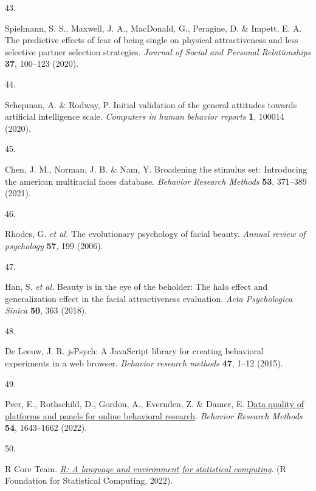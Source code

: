 \documentclass[
  man,floatsintext]{apa6}
\newlength{\cslhangindent}
\newlength{\csllabelwidth}
\newlength{\cslentryspacingunit} %
\newenvironment{CSLReferences}[2] %
 {%
  \setlength{\parindent}{0pt}
  \ifodd #1
  \let\oldpar\par
  \def\par{\hangindent=\cslhangindent\oldpar}
  \fi
  \setlength{\parskip}{#2\cslentryspacingunit}
 }%
 {}
\newcommand{\CSLLeftMargin}[1]{\parbox[t]{\csllabelwidth}{#1}}
\newcommand{\CSLRightInline}[1]{\parbox[t]{\linewidth - \csllabelwidth}{#1}\break}
\begin{document}
\begin{CSLReferences}{0}{0}
\leavevmode{}%
\CSLLeftMargin{43. }%
\CSLRightInline{Spielmann, S. S., Maxwell, J. A., MacDonald, G., Peragine, D. \& Impett, E. A. The predictive effects of fear of being single on physical attractiveness and less selective partner selection strategies. \emph{Journal of Social and Personal Relationships} \textbf{37}, 100--123 (2020).}

\leavevmode{}%
\CSLLeftMargin{44. }%
\CSLRightInline{Schepman, A. \& Rodway, P. Initial validation of the general attitudes towards artificial intelligence scale. \emph{Computers in human behavior reports} \textbf{1}, 100014 (2020).}

\leavevmode{}%
\CSLLeftMargin{45. }%
\CSLRightInline{Chen, J. M., Norman, J. B. \& Nam, Y. Broadening the stimulus set: Introducing the american multiracial faces database. \emph{Behavior Research Methods} \textbf{53}, 371--389 (2021).}

\leavevmode{}%
\CSLLeftMargin{46. }%
\CSLRightInline{Rhodes, G. \emph{et al.} The evolutionary psychology of facial beauty. \emph{Annual review of psychology} \textbf{57}, 199 (2006).}

\leavevmode{}%
\CSLLeftMargin{47. }%
\CSLRightInline{Han, S. \emph{et al.} Beauty is in the eye of the beholder: The halo effect and generalization effect in the facial attractiveness evaluation. \emph{Acta Psychologica Sinica} \textbf{50}, 363 (2018).}

\leavevmode{}%
\CSLLeftMargin{48. }%
\CSLRightInline{De Leeuw, J. R. jsPsych: A JavaScript library for creating behavioral experiments in a web browser. \emph{Behavior research methods} \textbf{47}, 1--12 (2015).}

\leavevmode{}%
\CSLLeftMargin{49. }%
\CSLRightInline{Peer, E., Rothschild, D., Gordon, A., Evernden, Z. \& Damer, E. \href{https://doi.org/10.3758/s13428-021-01694-3}{Data quality of platforms and panels for online behavioral research}. \emph{Behavior Research Methods} \textbf{54}, 1643--1662 (2022).}

\leavevmode{}%
\CSLLeftMargin{50. }%
\CSLRightInline{R Core Team. \emph{\href{https://www.R-project.org/}{R: A language and environment for statistical computing}}. (R Foundation for Statistical Computing, 2022).}


\end{CSLReferences}
\end{document}
